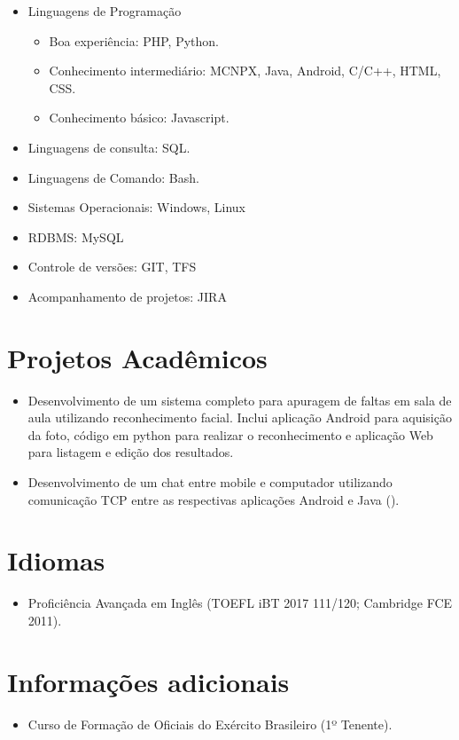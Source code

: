 \documentclass{tccv}
\begin{document}
    \begin{itemize}  
        \item Linguagens de Programação
            \begin{itemize}
                \item Boa experiência: PHP, Python.
                \item Conhecimento intermediário: MCNPX, Java, Android, C/C++, HTML, CSS.
                \item Conhecimento básico: Javascript.
            \end{itemize}
        \item Linguagens de consulta: SQL.
        \item Linguagens de Comando: Bash.
        \item Sistemas Operacionais: Windows, Linux
        \item RDBMS: MySQL 
        \item Controle de versões: GIT, TFS
        \item Acompanhamento de projetos: JIRA
    \end{itemize}

\section{Projetos Acadêmicos}
    
    \begin{itemize}
        \item Desenvolvimento de um sistema completo para apuragem de faltas em sala de aula utilizando reconhecimento facial. Inclui aplicação Android para aquisição da foto, código em python para realizar o reconhecimento e aplicação Web para listagem e edição dos resultados.
        \item Desenvolvimento de um chat entre mobile e computador utilizando comunicação TCP entre as respectivas aplicações Android e Java (\href{https://github.com/gdelfs/Messenger-Android-Computador}{\faCode}).
    \end{itemize}

\section{Idiomas}
    
    \begin{itemize}
        \item Proficiência Avançada em Inglês (TOEFL iBT 2017 111/120; Cambridge FCE 2011).
    \end{itemize}

\section{Informações adicionais}
    
    \begin{itemize}
        \item Curso de Formação de Oficiais do Exército Brasileiro (1º Tenente).
    \end{itemize}
    
\end{document}

